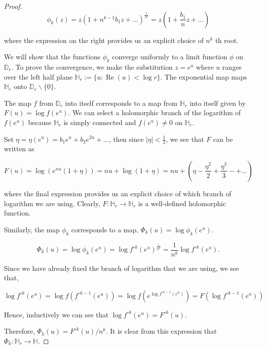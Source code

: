 \begin{proof}
$$
\phi_{k}(z)=z\left(1+n^{k-1} b_{1} z+\ldots\right)^{\frac{1}{n^{k}}}=z\left(1+\frac{b_{1}}{n} z+\ldots\right)
$$

where the expression on the right provides us an explicit choice of $n^{k}$ th root.

We will show that the functions $\phi_{k}$ converge uniformly to a limit function $\phi$ on $\mathbb{D}_{r}$. To prove the convergence, we make the substitution $z=e^{u}$ where $u$ ranges over the left half plane $\mathbb{H}_{r}:=\{u: \operatorname{Re}(u)<\log r\}$. The exponential map maps $\mathbb{H}_{r}$ onto $\mathbb{D}_{r} \backslash\{0\}$.

The map $f$ from $\mathbb{D}_{r}$ into itself corresponds to a map from $\mathbb{H}_{r}$ into itself given by $F(u)=\log f\left(e^{u}\right)$. We can select a holomorphic branch of the logarithm of $f\left(e^{u}\right)$ because $\mathbb{H}_{r}$ is simply connected and $f\left(e^{u}\right) \neq 0$ on $\mathbb{H}_{r}$.

Set $\eta=\eta\left(e^{u}\right)=b_{1} e^{u}+b_{2} e^{2 u}+\ldots$, then since $|\eta|<\frac{1}{2}$, we see that $F$ can be written as

$$
F(u)=\log \left(e^{n u}(1+\eta)\right)=n u+\log (1+\eta)=n u+\left(\eta-\frac{\eta^{2}}{2}+\frac{\eta^{3}}{3}-+\ldots\right)
$$

where the final expression provides us an explicit choice of which branch of logarithm we are using. Clearly, $F: \mathbb{H}_{r} \rightarrow \mathbb{H}_{r}$ is a well-defined holomorphic function.

Similarly, the map $\phi_{k}$ corresponds to a map, $\Phi_{k}(u)=\log \phi_{k}\left(e^{u}\right)$.

$$
\Phi_{k}(u)=\log \phi_{k}\left(e^{u}\right)=\log f^{\circ k}\left(e^{u}\right)^{\frac{1}{n^{k}}}=\frac{1}{n^{k}} \log f^{\circ k}\left(e^{u}\right) .
$$

Since we have already fixed the branch of logarithm that we are using, we see that,

$$
\log f^{\circ k}\left(e^{u}\right)=\log f\left(f^{\circ k-1}\left(e^{u}\right)\right)=\log f\left(e^{\log f^{\circ k-1}\left(e^{u}\right)}\right)=F\left(\log f^{\circ k-1}\left(e^{u}\right)\right)
$$

Hence, inductively we can see that $\log f^{\circ k}\left(e^{u}\right)=F^{\circ k}(u)$.

Therefore, $\Phi_{k}(u)=F^{\circ k}(u) / n^{k}$. It is clear from this expression that $\Phi_{k}: \mathbb{H}_{r} \rightarrow \mathbb{H}$.


\end{proof}
